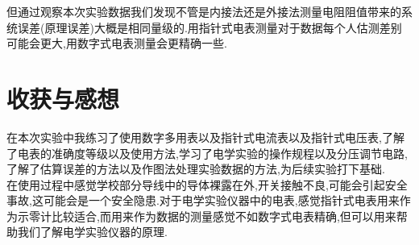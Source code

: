 \documentclass[a4 paper,12pt]{article}
\begin{document}
但通过观察本次实验数据我们发现不管是内接法还是外接法测量电阻阻值带来的系统误差(原理误差)大概是相同量级的.用指针式电表测量对于数据每个人估测差别可能会更大,用数字式电表测量会更精确一些.
\section{收获与感想}
在本次实验中我练习了使用数字多用表以及指针式电流表以及指针式电压表,了解了电表的准确度等级以及使用方法,学习了电学实验的操作规程以及分压调节电路,了解了估算误差的方法以及作图法处理实验数据的方法,为后续实验打下基础.\\

在使用过程中感觉学校部分导线中的导体裸露在外,开关接触不良,可能会引起安全事故,这可能会是一个安全隐患.对于电学实验仪器中的电表,感觉指针式电表用来作为示零计比较适合,而用来作为数据的测量感觉不如数字式电表精确,但可以用来帮助我们了解电学实验仪器的原理.
\end{document}
